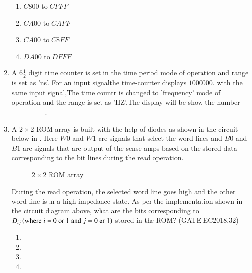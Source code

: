 \begin{enumerate}[label=\arabic*.,ref=\theenumi]
\begin{enumerate}
\item ${C800}$ to ${CFFF}$
\item ${CA00}$ to ${CAFF}$
\item ${CA00}$ to ${C8FF}$
\item ${DA00}$ to ${DFFF}$
\end{enumerate}  


\item A $6{\frac{1}{2}}$ digit time counter is set in the time period mode of operation and range is set as 'ns'. For an input signalthe time-counter displays $1000000$. with the same input signal,The time countr is changed to 'frequency' mode of operation and the range is set as 'HZ'.The display will be show the number$\underline{\hspace{2cm}}$.
\hfill{}


\item  A $2\times2$ ROM array is built with the help of diodes as shown in the circuit below
	in . Here $W0$ and $W1$ are signals that select the word lines and $B0$ and $B1$ are signals that are output of the sense amps based on the stored data corresponding to the bit lines during the read operation.
%
\begin{figure}[H]
        \centering
	\resizebox{0.75\columnwidth}{!}{%
        
	}
        \caption{ $2\times 2$ ROM array}
	\label{fig:2rom}
\end{figure}
%
		During the read operation, the selected word line goes high and the other word line is in a high impedance state. As per the implementation shown in the circuit diagram above, what are the bits corresponding to $D_{ij}\left(\text{where $i=0$ or $1$ and $j=0$ or $1$}\right)$ stored in the ROM?
	\hfill(GATE EC2018,32)
\begin{enumerate}
    \item {}
    \item {}
    \item {}    
    \item {}
\end{enumerate}


\end{enumerate}
